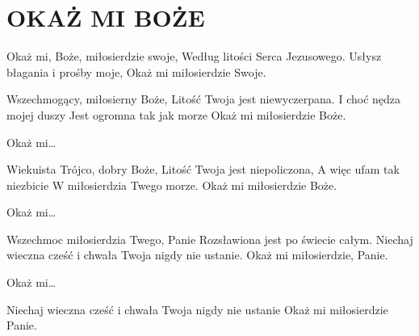 \documentclass[../../../songbook.tex]{subfiles}
\begin{document}
\TabPositions{8cm} %
\section*{OKAŻ MI BOŻE}
\vspace{0.5cm}
\-\hspace{1cm} Okaż mi, Boże, miłosierdzie swoje,	  \newline
\-\hspace{1cm} Według litości Serca Jezusowego.		   \newline
\-\hspace{1cm} Usłysz błagania i prośby moje,		  \newline
\-\hspace{1cm} Okaż mi miłosierdzie Swoje. 		 \newline

Wszechmogący, miłosierny Boże,			 \newline
Litość Twoja jest niewyczerpana.		   \newline
I choć nędza mojej duszy 				 \newline
Jest ogromna tak jak morze				 \newline
Okaż mi miłosierdzie Boże.				  \newline

\-\hspace{1cm} Okaż mi…			\newline

Wiekuista Trójco, dobry Boże,		\newline
Litość Twoja jest niepoliczona,		\newline
A więc ufam tak niezbicie 		\newline
W miłosierdzia Twego morze.		\newline
Okaż mi miłosierdzie Boże.		\newline

\-\hspace{1cm} Okaż mi…		\newline

Wszechmoc miłosierdzia Twego, Panie 		\newline
Rozsławiona jest po świecie całym.		\newline
Niechaj wieczna cześć i chwała 		\newline
Twoja nigdy nie ustanie.		\newline
Okaż mi miłosierdzie, Panie.		\newline

\-\hspace{1cm} Okaż mi…		\newline

Niechaj wieczna cześć i chwała		\newline
Twoja nigdy nie ustanie		\newline
Okaż mi miłosierdzie Panie.		\newline
\end{document}

